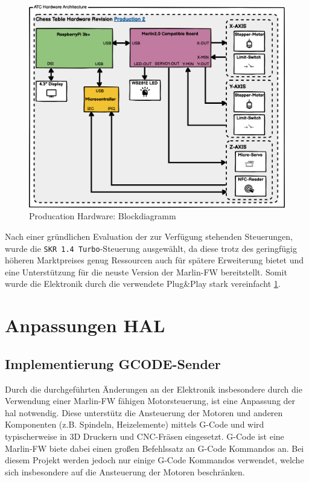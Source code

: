 \begin{figure}
\centering
\includegraphics{images/ATC_Hardware_Architecture_PROD.png}
\caption{Producation Hardware: Blockdiagramm
\label{ATC_Hardware_Architecture_PROD}}
\end{figure}

Nach einer gründlichen Evaluation der zur Verfügung stehenden
Steuerungen, wurde die \passthrough{\lstinline!SKR 1.4 Turbo!}-Steuerung
ausgewählt, da diese trotz des geringfügig höheren Marktpreises genug
Ressourcen auch für spätere Erweiterung bietet und eine Unterstützung
für die neuste Version der Marlin-FW\cite{marlinfw} bereitstellt.
Somit wurde die Elektronik durch die verwendete Plug\&Play stark
vereinfacht \ref{ATC_Hardware_Architecture_PROD}.

\hypertarget{anpassungen-hal}{%
\section{Anpassungen HAL}\label{anpassungen-hal}}

\hypertarget{implementierung-gcode-sender}{%
\subsection{Implementierung
GCODE-Sender}\label{implementierung-gcode-sender}}

Durch die durchgeführten Änderungen an der Elektronik insbesondere durch
die Verwendung einer Marlin-FW\cite{marlinfw} fähigen
Motorsteuerung, ist eine Anpassung der \gls{hal} notwendig. Diese
unterstütz die Ansteuerung der Motoren und anderen Komponenten (z.B.
Spindeln, Heizelemente) mittels G-Code und wird typischerweise in 3D
Druckern und CNC-Fräsen eingesetzt. G-Code ist eine
Marlin-FW\cite{marlinfw} biete dabei einen großen Befehlssatz an
G-Code Kommandos an. Bei diesem Projekt werden jedoch nur einige G-Code
Kommandos verwendet, welche sich insbesondere auf die Ansteuerung der
Motoren beschränken.

